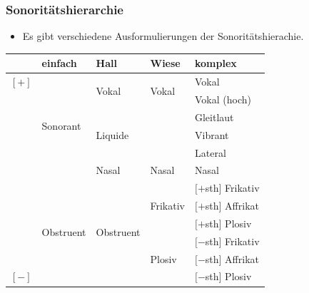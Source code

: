 \begin{frame}
\frametitle{Sonoritätshierarchie}

\begin{itemize}
	\item Es gibt verschiedene Ausformulierungen der Sonoritätshierachie.

\end{itemize}

\begin{table}
\centering
\begin{tabular}{l|l|l|l|l} 
	 & einfach 				  	 & Hall 					  & \textbf{Wiese} 				& komplex  \\ 
\hline
\hline 
$[+]$& \multirow{6}{*}{Sonorant} & \multirow{2}{*}{Vokal} 	  & \multirow{2}{*}{Vokal} 		& Vokal  \\ 
	 & 							 & 						 	  &								& Vokal (hoch) \\
\cline{3-5}			
	 &							 & \multirow{3}{*}{Liquide}   &								& Gleitlaut \\
	 &						  	 &	 						  & \textipa{/\textscr /}		& Vibrant \\
\cline{4-5}			
	 &						 	 &							  & \textipa{/l/}				& Lateral \\
\cline{3-5}			
	 &							 & Nasal					  & Nasal						& Nasal \\
\hline			
	 &\multirow{6}{*}{Obstruent} & \multirow{6}{*}{Obstruent} & \multirow{3}{*}{Frikativ}	& $[+$sth$]$ Frikativ \\
	 &						 	 &							  &								& $[+$sth$]$ Affrikat \\		
	 &							 &							  &								& $[+$sth$]$ Plosiv \\
\cline{4-5}			
	 &						  	 &							  & \multirow{3}{*}{Plosiv}		& $[-$sth$]$ Frikativ \\
	 &						 	 &							  &								& $[-$sth$]$ Affrikat \\		
$[-]$&							 &							  &								& $[-$sth$]$ Plosiv \\
		
\end{tabular} 

\end{table}

\end{frame}




